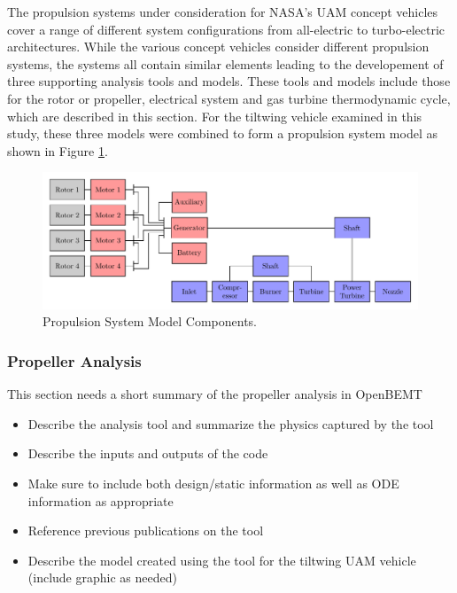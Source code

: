
The propulsion systems under consideration for NASA's UAM concept vehicles cover a range of different system configurations from all-electric to turbo-electric architectures.
While the various concept vehicles consider different propulsion systems, the systems all contain similar elements leading to the developement of three supporting analysis tools and models.
These tools and models include those for the rotor or propeller, electrical system and gas turbine thermodynamic cycle, which are described in this section.  
For the tiltwing vehicle examined in this study, these three models were combined to form a propulsion system model as shown in Figure \ref{f:turboelectric}. 



\begin{figure}
\begin{center}
 \includegraphics[width=1.0\textwidth]{../Images/Propulsion_system.pdf}
 \caption{Propulsion System Model Components.}
 \label{f:turboelectric}
\end{center}
\end{figure}

\subsubsection{Propeller Analysis} %
This section needs a short summary of the propeller analysis in OpenBEMT
\begin{itemize}
    \item Describe the analysis tool and summarize the physics captured by the tool
    \item Describe the inputs and outputs of the code
    \item Make sure to include both design/static information as well as ODE information as appropriate
    \item Reference previous publications on the tool
    \item Describe the model created using the tool for the tiltwing UAM vehicle (include graphic as needed)
\end{itemize}

